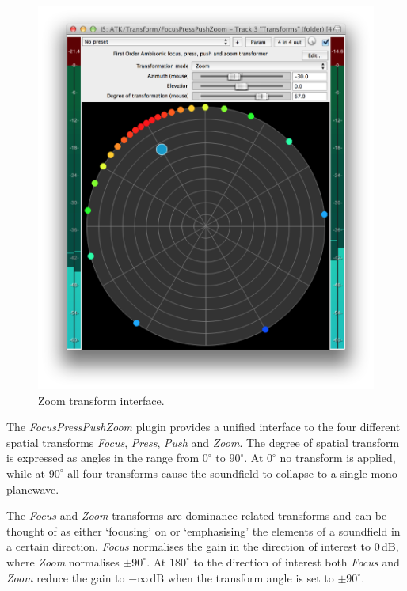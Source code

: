 \documentclass{article}
\begin{document}
\begin{figure}[h]
\captionsetup{aboveskip=-6pt}
\centering
\includegraphics[width=0.8\columnwidth]{figures/zoomTransform.png}
\caption{Zoom transform interface.\label{fig:zoomTransform}}
\end{figure}

The \emph{FocusPressPushZoom} plugin provides a unified interface to the four different spatial transforms \emph{Focus}, \emph{Press}, \emph{Push} and \emph{Zoom}.
The degree of spatial transform is expressed as angles in the range from $0^\circ$ to $90^\circ$. 
At $0^\circ$ no transform is applied, while at $90^\circ$ all four transforms cause the soundfield to collapse to a single mono planewave.

The \emph{Focus} and \emph{Zoom} transforms are dominance related transforms and can be thought of as either `focusing' on or `emphasising' the elements of a soundfield in a certain direction.
\emph{Focus} normalises the gain in the direction of interest to $0\,\mathrm{dB}$, where \emph{Zoom} normalises $\pm90^\circ$.
At $180^\circ$ to the direction of interest both \emph{Focus} and \emph{Zoom} reduce the gain to $-\infty\,\mathrm{dB}$ when the transform angle is set to $\pm90^\circ$.
\end{document}
